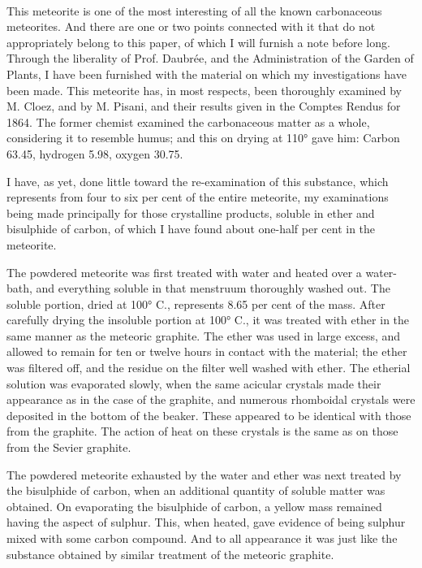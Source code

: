 \documentclass[a4paper, 11pt, oneside, english]{article}
\begin{document}
\paragraph{}
This meteorite is one of the most interesting of all the known carbonaceous meteorites. And there are one or two points connected with it that do not appropriately belong to this paper, of which I will furnish a note before long. Through the liberality of Prof. Daubrée, and the Administration of the Garden of Plants, I have been furnished with the material on which my investigations have been made. This meteorite has, in most respects, been thoroughly examined by M. Cloez, and by M. Pisani, and their results given in the Comptes Rendus for 1864. The former chemist examined the carbonaceous matter as a whole, considering it to resemble humus; and this on drying at 110° gave him: Carbon 63.45, hydrogen 5.98, oxygen 30.75.

I have, as yet, done little toward the re-examination of this substance, which represents from four to six per cent of the entire meteorite, my examinations being made principally for those crystalline products, soluble in ether and bisulphide of carbon, of which I have found about one-half per cent in the meteorite.

The powdered meteorite was first treated with water and heated over a water-bath, and everything soluble in that menstruum thoroughly washed out. The soluble portion, dried at 100° C., represents 8.65 per cent of the mass. After carefully drying the insoluble portion at 100° C., it was treated with ether in the same manner as the meteoric graphite. The ether was used in large excess, and allowed to remain for ten or twelve hours in contact with the material; the ether was filtered off, and the residue on the filter well washed with ether. The etherial solution was evaporated slowly, when the same acicular crystals made their appearance as in the case of the graphite, and numerous rhomboidal crystals were deposited in the bottom of the beaker. These appeared to be identical with those from the graphite. The action of heat on these crystals is the same as on those from the Sevier graphite.

The powdered meteorite exhausted by the water and ether was next treated by the bisulphide of carbon, when an additional quantity of soluble matter was obtained. On evaporating the bisulphide of carbon, a yellow mass remained having the aspect of sulphur. This, when heated, gave evidence of being sulphur mixed with some carbon compound. And to all appearance it was just like the substance obtained by similar treatment of the meteoric graphite.
\end{document}

